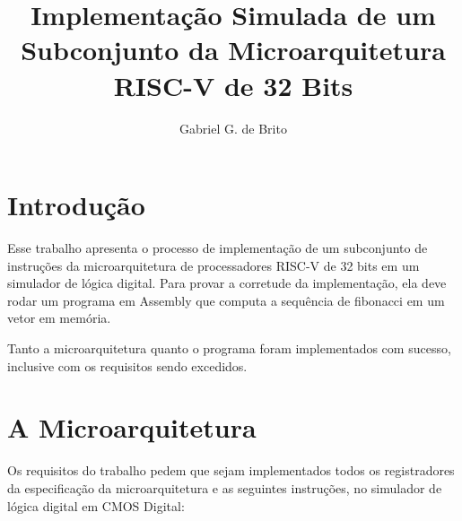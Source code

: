 \documentclass[twocolumn]{article}
\title{Implementação Simulada de um Subconjunto da Microarquitetura RISC-V de 32
  Bits}
\author{Gabriel G. de Brito}
\begin{document}
\maketitle

\section{Introdução}

Esse trabalho apresenta o processo de implementação de um subconjunto de
instruções da microarquitetura de processadores RISC-V de 32 bits em um
simulador de lógica digital. Para provar a corretude da implementação, ela deve
rodar um programa em Assembly que computa a sequência de fibonacci\cite{fib} em
um vetor em memória.

Tanto a microarquitetura quanto o programa foram implementados com sucesso,
inclusive com os requisitos sendo excedidos.

\section{A Microarquitetura}

Os requisitos do trabalho pedem que sejam implementados todos os registradores
da especificação da microarquitetura e as seguintes instruções\cite{spec}, no
simulador de lógica digital em CMOS Digital\cite{digital}:
\end{document}
